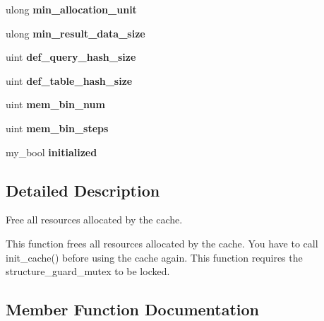 \begin{DoxyCompactItemize}
\item 
\mbox{\label{classQuery__cache_a4db08c50f0aff2f118be74d15dea9c2e}} 
ulong {\bfseries min\+\_\+allocation\+\_\+unit}
\item 
\mbox{\label{classQuery__cache_ac44099994c8de1d01110126f6c3e8d33}} 
ulong {\bfseries min\+\_\+result\+\_\+data\+\_\+size}
\item 
\mbox{\label{classQuery__cache_a81bb8fa89076999b3b1c028eb1c6fa1a}} 
uint {\bfseries def\+\_\+query\+\_\+hash\+\_\+size}
\item 
\mbox{\label{classQuery__cache_ac0e68c4dec284c200f68ded3e45d57fd}} 
uint {\bfseries def\+\_\+table\+\_\+hash\+\_\+size}
\item 
\mbox{\label{classQuery__cache_a77f6aeee67b64bdbe071c716d76d41e1}} 
uint {\bfseries mem\+\_\+bin\+\_\+num}
\item 
\mbox{\label{classQuery__cache_a0c58f72f595fbfde9add6b00959ec40d}} 
uint {\bfseries mem\+\_\+bin\+\_\+steps}
\item 
\mbox{\label{classQuery__cache_a0b90791be47250a072ff4823df5e4a73}} 
my\+\_\+bool {\bfseries initialized}
\end{DoxyCompactItemize}


\subsection{Detailed Description}
Free all resources allocated by the cache.

This function frees all resources allocated by the cache. You have to call init\+\_\+cache() before using the cache again. This function requires the structure\+\_\+guard\+\_\+mutex to be locked. 

\subsection{Member Function Documentation}
\mbox{\label{classQuery__cache_aee3618ded5824d751e181940cc42cb9c}} 
